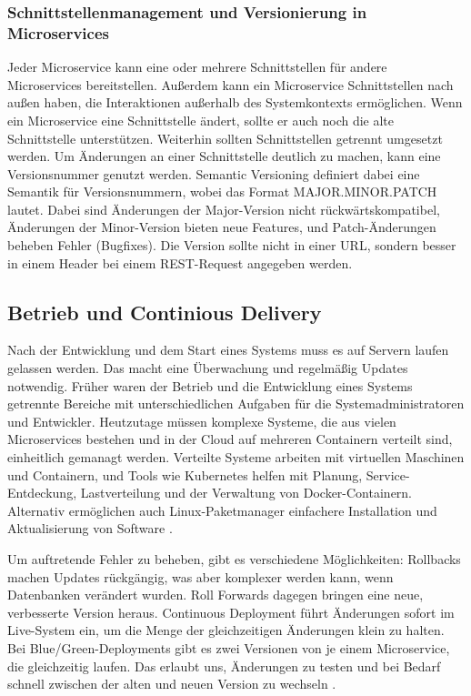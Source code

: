 {%
\subsubsection{Schnittstellenmanagement und Versionierung in Microservices}

Jeder Microservice kann eine oder mehrere Schnittstellen für andere Microservices bereitstellen. Außerdem kann ein Microservice Schnittstellen nach außen haben, die Interaktionen außerhalb des Systemkontexts ermöglichen. Wenn ein Microservice eine Schnittstelle ändert, sollte er auch noch die alte Schnittstelle unterstützen. Weiterhin sollten Schnittstellen getrennt umgesetzt werden. Um Änderungen an einer Schnittstelle deutlich zu machen, kann eine Versionsnummer genutzt werden. Semantic Versioning definiert dabei eine Semantik für Versionsnummern, wobei das Format MAJOR.MINOR.PATCH lautet. Dabei sind Änderungen der Major-Version nicht rückwärtskompatibel, Änderungen der Minor-Version bieten neue Features, und Patch-Änderungen beheben Fehler (Bugfixes). Die Version sollte nicht in einer URL, sondern besser in einem Header bei einem REST-Request angegeben werden.
\cite[S. 190 - 192]{wolff}

\pagebreak 
\subsection{Betrieb und Continious Delivery}

Nach der Entwicklung und dem Start eines Systems muss es auf Servern laufen gelassen werden. Das macht eine Überwachung und regelmäßig Updates notwendig. Früher waren der Betrieb und die Entwicklung eines Systems getrennte Bereiche mit unterschiedlichen Aufgaben für die Systemadministratoren und Entwickler. Heutzutage müssen komplexe Systeme, die aus vielen Microservices bestehen und in der Cloud auf mehreren Containern verteilt sind, einheitlich gemanagt werden. Verteilte Systeme arbeiten mit virtuellen Maschinen und Containern, und Tools wie Kubernetes helfen mit Planung, Service-Entdeckung, Lastverteilung und der Verwaltung von Docker-Containern. Alternativ ermöglichen auch Linux-Paketmanager einfachere Installation und Aktualisierung von Software \cite[S.179,181]{sommerville} \cite[S.253]{richards}.

Um auftretende Fehler zu beheben, gibt es verschiedene Möglichkeiten: Rollbacks machen Updates rückgängig, was aber komplexer werden kann, wenn Datenbanken verändert wurden. Roll Forwards dagegen bringen eine neue, verbesserte Version heraus. Continuous Deployment führt Änderungen sofort im Live-System ein, um die Menge der gleichzeitigen Änderungen klein zu halten. Bei Blue/Green-Deployments gibt es zwei Versionen von je einem Microservice, die gleichzeitig laufen. Das erlaubt uns, Änderungen zu testen und bei Bedarf schnell zwischen der alten und neuen Version zu wechseln \cite[S. 263 - 269]{wolff}.

}
